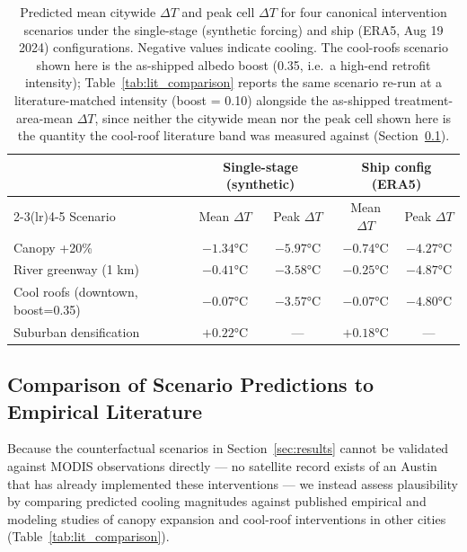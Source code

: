 \documentclass[12pt, letterpaper]{article}
\begin{document}
\begin{table}[ht]
  \centering
  \caption{Predicted mean citywide $\Delta T$ and peak cell $\Delta T$
  for four canonical intervention scenarios under the single-stage
  (synthetic forcing) and ship (ERA5, Aug 19 2024) configurations.
  Negative values indicate cooling. The cool-roofs scenario shown here
  is the as-shipped albedo boost (0.35, i.e.\ a high-end retrofit
  intensity); Table~\ref{tab:lit_comparison} reports the same scenario
  re-run at a literature-matched intensity (boost = 0.10) alongside the
  as-shipped treatment-area-mean $\Delta T$, since neither the citywide
  mean nor the peak cell shown here is the quantity the cool-roof
  literature band was measured against (Section~\ref{sec:lit_comparison}).}
  \label{tab:scenarios}
  \begin{tabular}{lcccc}
    \toprule
    & \multicolumn{2}{c}{Single-stage (synthetic)} &
      \multicolumn{2}{c}{Ship config (ERA5)} \\
    \cmidrule(lr){2-3}\cmidrule(lr){4-5}
    Scenario & Mean $\Delta T$ & Peak $\Delta T$
             & Mean $\Delta T$ & Peak $\Delta T$ \\
    \midrule
    Canopy +20\%           & $-1.34$°C & $-5.97$°C & $-0.74$°C & $-4.27$°C \\
    River greenway (1 km)  & $-0.41$°C & $-3.58$°C & $-0.25$°C & $-4.87$°C \\
    Cool roofs (downtown, boost=0.35) & $-0.07$°C & $-3.57$°C & $-0.07$°C & $-4.80$°C \\
    Suburban densification & $+0.22$°C & —          & $+0.18$°C & — \\
    \bottomrule
  \end{tabular}
\end{table}

\subsection{Comparison of Scenario Predictions to Empirical Literature}
\label{sec:lit_comparison}

Because the counterfactual scenarios in Section~\ref{sec:results} cannot be
validated against MODIS observations directly — no satellite record exists
of an Austin that has already implemented these interventions — we instead
assess plausibility by comparing predicted cooling magnitudes against
published empirical and modeling studies of canopy expansion and cool-roof
interventions in other cities (Table~\ref{tab:lit_comparison}).
\end{document}
